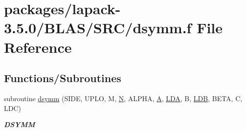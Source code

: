 \hypertarget{lapack-3_85_80_2BLAS_2SRC_2dsymm_8f}{}\section{packages/lapack-\/3.5.0/\+B\+L\+A\+S/\+S\+R\+C/dsymm.f File Reference}
\label{lapack-3_85_80_2BLAS_2SRC_2dsymm_8f}
\subsection*{Functions/\+Subroutines}
\begin{DoxyCompactItemize}
\item 
subroutine \hyperlink{group__double__blas__level3_ga253c8edb8b21d1b5b1783725c2a6b692}{dsymm} (S\+I\+D\+E, U\+P\+L\+O, M, \hyperlink{polmisc_8c_a0240ac851181b84ac374872dc5434ee4}{N}, A\+L\+P\+H\+A, \hyperlink{classA}{A}, \hyperlink{example__user_8c_ae946da542ce0db94dced19b2ecefd1aa}{L\+D\+A}, B, \hyperlink{example__user_8c_a50e90a7104df172b5a89a06c47fcca04}{L\+D\+B}, B\+E\+T\+A, C, L\+D\+C)
\begin{DoxyCompactList}\small\item\em {\bfseries D\+S\+Y\+M\+M} \end{DoxyCompactList}\end{DoxyCompactItemize}
